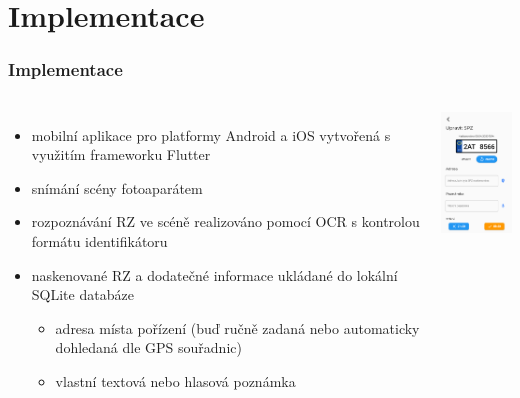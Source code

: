 \documentclass{beamer}
\begin{document}
\section{Implementace}
\begin{frame}
    \frametitle{Implementace}
    \begin{columns}
    \begin{itemize}

        \item mobilní aplikace pro platformy Android a iOS vytvořená s využitím frameworku Flutter
        \item snímání scény fotoaparátem
        \item rozpoznávání RZ ve scéně realizováno pomocí OCR s kontrolou formátu identifikátoru
        \item naskenované RZ a dodatečné informace ukládané do lokální SQLite databáze
        \begin{itemize}
            \item adresa místa pořízení (buď ručně zadaná nebo automaticky dohledaná dle GPS souřadnic)    
            \item vlastní textová nebo hlasová poznámka
        \end{itemize}
    \end{itemize}
    {\includegraphics[width=2.8cm]{img/screen-preview.png}}

    \end{columns} 
\end{frame}
\end{document}
